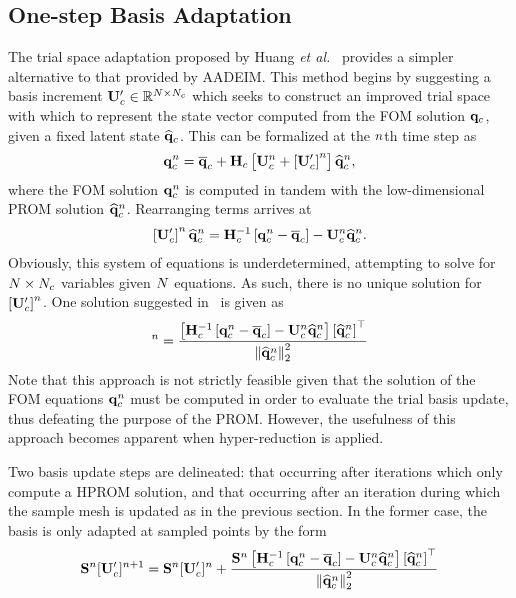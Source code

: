\subsection{One-step Basis Adaptation}
%
The trial space adaptation proposed by Huang \textit{et al.}~\cite{Huang2022a} provides a simpler alternative to that provided by AADEIM. This method begins by suggesting a basis increment $\consTrialUpdate \inRTwo{\numDOF}{\numConsModes}$ which seeks to construct an improved trial space with which to represent the state vector computed from the FOM solution $\mathbf{q}_{c}$, given a fixed latent state $\mathbf{\widehat{q}}_{c}$. This can be formalized at the $n$th time step as
%
\begin{eqnarray}
	\consVec^{\timeIdx} = \consVecCent + \consScale \left[\consTrial^{\timeIdx} + \left[\consTrialUpdate\right]^{\timeIdx} \right] \consVecCoef^{\timeIdx},
\end{eqnarray}
%
where the FOM solution $\mathbf{q}_{c}^{n}$ is computed in tandem with the low-dimensional PROM solution $\mathbf{\widehat{q}}_{c}^{n}$. Rearranging terms arrives at
%
\begin{eqnarray}
	\left[\consTrialUpdate\right]^{\timeIdx} \consVecCoef^{\timeIdx} = \consScaleInv \left[\consVec^{\timeIdx} - \consVecCent\right] - \consTrial^{\timeIdx} \consVecCoef^{\timeIdx}.
\end{eqnarray}
%
Obviously, this system of equations is underdetermined, attempting to solve for $N \times N_c$ variables given $N$ equations. As such, there is no unique solution for $\left[\consTrialUpdate\right]^{\timeIdx}$. One solution suggested in~\cite{Huang2022a} is given as
%
\begin{equation}
	[\consTrialUpdate]^{\timeIdx} = \frac{\left[\consScaleInv\left[\consVec^{\timeIdx} - \consVecCent\right] - \consTrial^{\timeIdx} \consVecCoef^{\timeIdx}\right]\left[\consVecCoef^{\timeIdx}\right]^\top}{\left\Vert \consVecCoef^{\timeIdx} \right\Vert^2_2}
\end{equation}
%
Note that this approach is not strictly feasible given that the solution of the FOM equations $\mathbf{q}_{c}^{n}$ must be computed in order to evaluate the trial basis update, thus defeating the purpose of the PROM. However, the usefulness of this approach becomes apparent when hyper-reduction is applied.

Two basis update steps are delineated: that occurring after iterations which only compute a HPROM solution, and that occurring after an iteration during which the sample mesh is updated as in the previous section. In the former case, the basis is only adapted at sampled points by the form
%
\begin{equation}
	\sampMat^{\timeIdx} [\consTrialUpdate]^{\timeIdx+1} = \sampMat^{\timeIdx} [\consTrialUpdate]^{\timeIdx} + \frac{\sampMat^{\timeIdx} \left[\consScaleInv\left[\consVec^{\timeIdx} - \consVecCent\right] - \consTrial^{\timeIdx} \consVecCoef^{\timeIdx}\right]\left[\consVecCoef^{\timeIdx}\right]^\top}{\left\Vert \consVecCoef^{\timeIdx} \right\Vert^2_2}
\end{equation}
%

